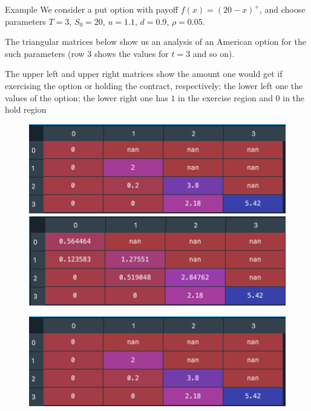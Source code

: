 \documentclass[9 pt]{beamer} %
\begin{document}
\begin{frame}{Example}
We consider a put option with payoff $f(x)=(20-x)^+$, and choose parameters $T=3$, $S_0=20$, $u=1.1$, $d=0.9$, $\rho=0.05$. 

The triangular matrices below show us an analysis of an American option for the such parameters (row 3 shows the values for $t=3$ and so on). 

The upper left and upper right matrices show the amount one would get if exercising the option or holding the contract, respectively; the lower left one the values of the option; the lower right one has $1$ in the exercise region and $0$ in the hold region
 \begin{figure}
\centering
\begin{minipage}[b]{.5\textwidth}
  \centering
 \includegraphics[scale=0.4]{valueExercise.png}
\end{minipage}%
\begin{minipage}[b]{.5\textwidth}
  \centering
 \includegraphics[scale=0.4]{valueWait.png}
\end{minipage}
\end{figure}
 \begin{figure}
\centering
\begin{minipage}[b]{.5\textwidth}
  \centering
 \includegraphics[scale=0.4]{valueExercise.png}

\end{minipage}
\end{figure}
\end{frame}
\end{document}
